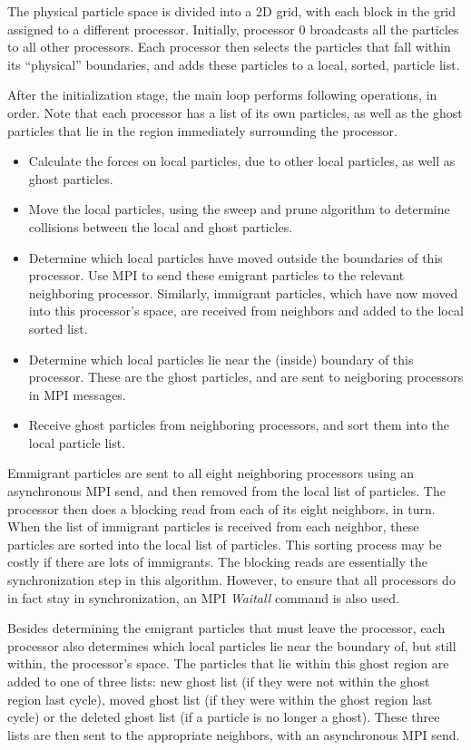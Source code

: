 \documentclass[11pt]{article} %
\begin{document}
The physical particle space is divided into a 2D grid, with each block in the grid assigned to a different processor. Initially, processor 0 broadcasts all the particles to all other processors. Each processor then selects the particles that fall within its ``physical'' boundaries, and adds these particles to a local, sorted, particle list.

After the initialization stage, the main loop performs following operations, in order. Note that each processor has a list of its own particles, as well as the ghost particles that lie in the region immediately surrounding the processor.
\begin{itemize}
\item Calculate the forces on local particles, due to other local particles, as well as ghost particles.
\item Move the local particles, using the sweep and prune algorithm to determine collisions between the local and ghost particles.
\item Determine which local particles have moved outside the boundaries of this processor. Use MPI to send these emigrant particles to the relevant neighboring processor. Similarly, immigrant particles, which have now moved into this processor's space, are received from neighbors and added to the local sorted list.
\item Determine which local particles lie near the (inside) boundary of this processor. These are the ghost particles, and are sent to neigboring processors in MPI messages.
\item Receive ghost particles from neighboring processors, and sort them into the local particle list.
\end{itemize}

Emmigrant particles are sent to all eight neighboring processors using an asynchronous MPI send, and then removed from the local list of particles. The processor then does a blocking read from each of its eight neighbors, in turn. When the list of immigrant particles is received from each neighbor, these particles are sorted into the local list of particles. This sorting process may be costly if there are lots of immigrants. The blocking reads are essentially the synchronization step in this algorithm. However, to ensure that all processors do in fact stay in synchronization, an MPI {\em Waitall} command is also used.

Besides determining the emigrant particles that must leave the processor, each processor also determines which local particles lie near the boundary of, but still within, the processor's space. The particles that lie within this ghost region are added to one of three lists: new ghost list (if they were not within the ghost region last cycle), moved ghost list (if they were within the ghost region last cycle) or the deleted ghost list (if a particle is no longer a ghost). These three lists are then sent to the appropriate neighbors, with an asynchronous MPI send.
\end{document}
